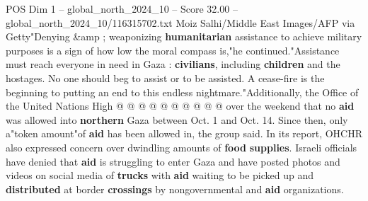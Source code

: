 \begin{textsample}{POS Dim 1 – global\_north\_2024\_10 – Score 32.00 – global\_north\_2024\_10/116315702.txt}
Moiz Salhi/Middle East Images/AFP via Getty"Denying \&amp ; weaponizing \textbf{humanitarian} assistance to achieve military purposes is a sign of how low the moral compass is,"he continued."Assistance must reach everyone in need in Gaza : \textbf{civilians}, including \textbf{children} and the hostages.
No one should beg to assist or to be assisted.
A cease-fire is the beginning to putting an end to this endless nightmare."Additionally, the Office of the United Nations High @ @ @ @ @ @ @ @ @ @ over the weekend that no \textbf{aid} was allowed into \textbf{northern} Gaza between Oct. 1 and Oct. 14.
Since then, only a"token amount"of \textbf{aid} has been allowed in, the group said.
In its report, OHCHR also expressed concern over dwindling amounts of \textbf{food} \textbf{supplies}.
Israeli officials have denied that \textbf{aid} is struggling to enter Gaza and have posted photos and videos on social media of \textbf{trucks} with \textbf{aid} waiting to be picked up and \textbf{distributed} at border \textbf{crossings} by nongovernmental and \textbf{aid} organizations.

\end{textsample}

